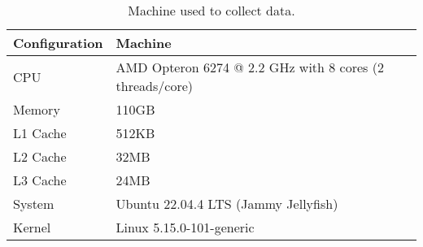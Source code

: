 \begin{table}[H]
    \centering
\begin{tabular}{lp{11.3cm}}
    \textbf{Configuration} & \textbf{Machine} \\ \hline
CPU           & AMD Opteron 6274 @ 2.2 GHz with 8 cores (2 threads/core)\\ \hline
Memory        & 110GB                                                   \\ \hline
L1 Cache      & 512KB                                                   \\ \hline
L2 Cache      & 32MB                                                    \\ \hline
L3 Cache      & 24MB                                                    \\ \hline
System        & Ubuntu 22.04.4 LTS (Jammy Jellyfish)                    \\ \hline
Kernel        & Linux 5.15.0-101-generic
\end{tabular}
\caption{Machine used to collect data.}
\label{table:machine}
\end{table}
